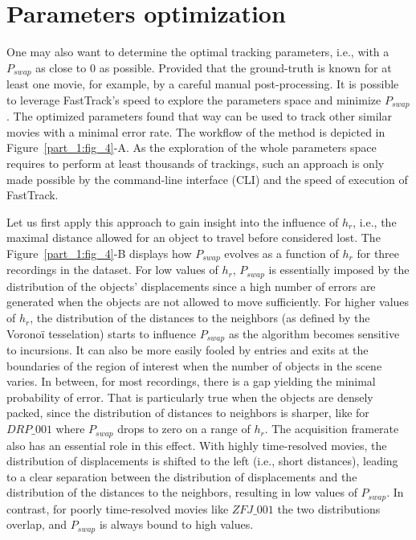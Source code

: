     \section{Parameters optimization}
    One may also want to determine the optimal tracking parameters, i.e., with a $P_{swap}$ as close to 0 as possible. Provided that the ground-truth is known for at least one movie, for example, by a careful manual post-processing. It is possible to leverage FastTrack's speed to explore the parameters space and minimize $P_{swap}$. The optimized parameters found that way can be used to track other similar movies with a minimal error rate. The workflow of the method is depicted in Figure~\ref{part_1:fig_4}-A. As the exploration of the whole parameters space requires to perform at least thousands of trackings, such an approach is only made possible by the command-line interface (CLI) and the speed of execution of FastTrack.

    Let us first apply this approach to gain insight into the influence of $h_r$, i.e., the maximal distance allowed for an object to travel before considered lost. The Figure~\ref{part_1:fig_4}-B displays how $P_{swap}$ evolves as a function of $h_r$ for three recordings in the dataset. For low values of $h_r$, $P_{swap}$ is essentially imposed by the distribution of the objects' displacements since a high number of errors are generated when the objects are not allowed to move sufficiently. For higher values of $h_r$, the distribution of the distances to the neighbors (as defined by the Voronoï tesselation) starts to influence $P_{swap}$ as the algorithm becomes sensitive to incursions. It can also be more easily fooled by entries and exits at the boundaries of the region of interest when the number of objects in the scene varies.
    In between, for most recordings, there is a gap yielding the minimal probability of error. That is particularly true when the objects are densely packed, since the distribution of distances to neighbors is sharper, like for $DRP\_001$ where $P_{swap}$ drops to zero on a range of $h_r$. The acquisition framerate also has an essential role in this effect. With highly time-resolved movies, the distribution of displacements is shifted to the left (i.e., short distances), leading to a clear separation between the distribution of displacements and the distribution of the distances to the neighbors, resulting in low values of $P_{swap}$. In contrast, for poorly time-resolved movies like $ZFJ\_001$ the two distributions overlap, and $P_{swap}$ is always bound to high values.

